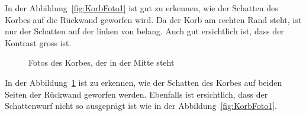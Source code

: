 In der Abbildung~\ref{fig:KorbFoto1} ist gut zu erkennen, wie der Schatten des Korbes auf die 
Rückwand geworfen wird. Da der Korb am rechten Rand steht, ist nur der Schatten auf der linken 
von belang. Auch gut ersichtlich ist, dass der Kontrast gross ist.
\newpage
%
\begin{figure}[h!]
\hfill
{}
\caption{Fotos des Korbes, der in der Mitte steht}
\label{fig:KorbFoto2}
\end{figure}
In der Abbildung~\ref{fig:KorbFoto2} ist zu erkennen, wie der Schatten des Korbes auf beiden Seiten der Rückwand geworfen werden. Ebenfalls ist ersichtlich, dass der Schattenwurf nicht so ausgeprägt ist wie in der Abbildung~\ref{fig:KorbFoto1}.






